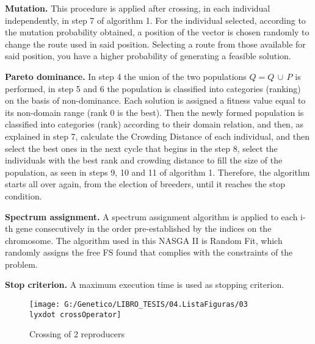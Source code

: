 \textbf{Mutation.} This procedure is applied after crossing, in each
individual independently, in step 7 of algorithm 1. For the individual
selected, according to the mutation probability obtained, a position
of the vector is chosen randomly to change the route used in said
position. Selecting a route from those available for said position,
you have a higher probability of generating a feasible solution. 

\textbf{Pareto dominance.} In step 4 the union of the two populations
$Q=Q\,\cup\,P$ is performed, in step 5 and 6 the population is classified
into categories (ranking) on the basis of non-dominance. Each solution
is assigned a fitness value equal to its non-domain range (rank 0
is the best). Then the newly formed population is classified into
categories (rank) according to their domain relation, and then, as
explained in step 7, calculate the Crowding Distance of each individual,
and then select the best ones in the next cycle that begins in the
step 8, select the individuals with the best rank and crowding distance
to fill the size of the population, as seen in steps 9, 10 and 11
of algorithm 1. Therefore, the algorithm starts all over again, from
the election of breeders, until it reaches the stop condition. 

\textbf{Spectrum assignment.} A spectrum assignment algorithm is applied
to each i-th gene consecutively in the order pre-established by the
indices on the chromosome. The algorithm used in this NASGA II is
Random Fit, which randomly assigns the free FS found that complies
with the constraints of the problem. 

\textbf{Stop criterion.} A maximum execution time is used as stopping
criterion. 

\phantom{}

\begin{figure}
\texttt{[image: G:/Genetico/LIBRO\_TESIS/04.ListaFiguras/03\\lyxdot crossOperator]}

\caption{Crossing of 2 reproducers}
\label{crossing_figure}
\end{figure}

